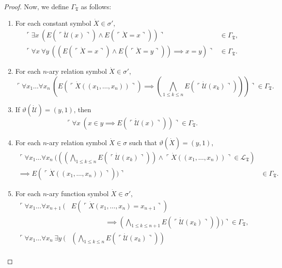 \documentclass[12pt]{article}
\numberwithin{equation}{section}
\begin{document}
\begin{proof}
Now, we define $\Gamma_{\mathfrak{T}}$ as follows:
\begin{enumerate}[label=(\arabic*)]
    \item\label{gamma1} For each constant symbol $\dot{X} \in \sigma'$,
    \begin{align*}
        \ulcorner \exists x \ (E(\ulcorner \dot{\mathcal{U}}(x) \urcorner) \wedge E(\ulcorner \dot{X} = x \urcorner)) \urcorner & \in \Gamma_{\mathfrak{T}}, \\
        \ulcorner \forall x \ \forall y \ ((E(\ulcorner \dot{X} = x \urcorner) \wedge E(\ulcorner \dot{X} = y \urcorner)) \implies x = y) \urcorner & \in \Gamma_{\mathfrak{T}}.
    \end{align*}
    \item For each $n$-ary relation symbol $\dot{X} \in \sigma'$, $$\ulcorner \forall x_1 \dots \forall x_n \ (E(\ulcorner \dot{X}((x_1, \dots, x_n)) \urcorner) \implies (\bigwedge_{1 \leq k \leq n} E(\ulcorner \dot{\mathcal{U}}(x_k) \urcorner))) \urcorner \in \Gamma_{\mathfrak{T}}.$$
    \item\label{gammaform3} If $\vartheta(\dot{\mathcal{U}}) = (y, 1)$, then $$\ulcorner \forall x \ (x \in y \implies E(\ulcorner \dot{\mathcal{U}}(x) \urcorner)) \urcorner \in \Gamma_{\mathfrak{T}}.$$
    \item\label{gammaform4} For each $n$-ary relation symbol $\dot{X} \in \sigma$ such that $\vartheta(\dot{X}) = (y, 1)$, 
    \begin{align*}
        \ulcorner \forall x_1 \dots \forall x_n \ (((\bigwedge_{1 \leq k \leq n} E(\ulcorner \dot{\mathcal{U}}(x_k) \urcorner)) \wedge \ulcorner \dot{X}((x_1, \dots, x_n)) \urcorner \in \mathcal{L}_{\mathfrak{T}}) & \\
        \implies E(\ulcorner \dot{X}((x_1, \dots, x_n)) \urcorner)) \urcorner & \in \Gamma_{\mathfrak{T}}.
    \end{align*}
    \item For each $n$-ary function symbol $\dot{X} \in \sigma'$, 
    \begin{align*}
        \ulcorner \forall x_1 \dots \forall x_{n+1} \ ( & E(\ulcorner \dot{X} (x_1, \dots, x_n) = x_{n+1} \urcorner) \\
        & \mspace{90mu} \implies (\bigwedge_{1 \leq k \leq n+1} E(\ulcorner \dot{\mathcal{U}}(x_k) \urcorner))) \urcorner \in \Gamma_{\mathfrak{T}}, \\
        \ulcorner \forall x_1 \dots \forall x_n \ \exists y \ ( & (\bigwedge_{1 \leq k \leq n} E(\ulcorner \dot{\mathcal{U}}(x_k) \urcorner)) \\

\end{align*}
\end{enumerate}
\end{proof}
\end{document}
